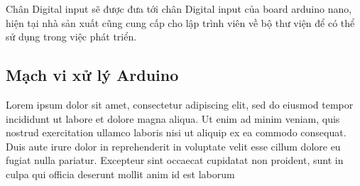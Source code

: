 Chân Digital input sẽ được đưa tới chân Digital input của board arduino nano, hiện tại nhà sản xuất cũng cung cấp cho lập trình viên về bộ thư viện để có thể sử dụng trong việc phát triển.

\newpage



\subsection{Mạch vi xử lý Arduino}
Lorem ipsum dolor sit amet, consectetur adipiscing elit, sed do eiusmod tempor incididunt ut labore et dolore magna aliqua. Ut enim ad minim veniam, quis nostrud exercitation ullamco laboris nisi ut aliquip ex ea commodo consequat. Duis aute irure dolor in reprehenderit in voluptate velit esse cillum dolore eu fugiat nulla pariatur. Excepteur sint occaecat cupidatat non proident, sunt in culpa qui officia deserunt mollit anim id est laborum











